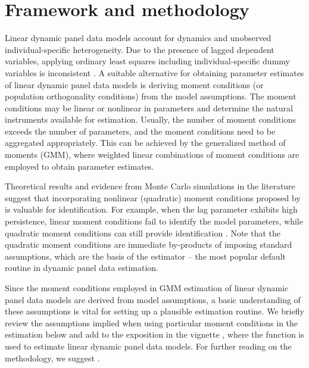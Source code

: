 \section{Framework and methodology}\label{sec:ldpdm}
Linear dynamic panel data models account for dynamics and unobserved individual-specific heterogeneity. Due to the presence of lagged dependent variables, applying ordinary least squares including individual-specific dummy variables is inconsistent \citep[see, e.g.,][]{Hsi2014}.
A suitable alternative for obtaining parameter estimates of linear dynamic panel data models is deriving moment conditions (or population orthogonality conditions) from the model assumptions. The moment conditions may be linear \citep{AndHsi1982,HolNewRos1988,AreBov1995} or nonlinear \citep{AhnSch1995} in parameters and determine the natural instruments available for estimation. Usually, the number of moment conditions exceeds the number of parameters, and the moment conditions need to be aggregated appropriately. This can be achieved by the generalized method of moments (GMM), where weighted linear combinations of moment conditions are employed to obtain parameter estimates.

Theoretical results and evidence from Monte Carlo simulations in the literature suggest that incorporating nonlinear (quadratic) moment conditions proposed by \citet{AhnSch1995} is valuable for identification. For example, when the lag parameter exhibits high persistence, linear moment conditions fail to identify the model parameters, while quadratic moment conditions can still provide identification \citep{BunKle2014,BunSar2015,GorHanXue2016,PuaFriSch2019a,PuaFriSch2019b}.
Note that the quadratic moment conditions are immediate by-products of imposing
standard assumptions, which are the basis of the \cite{AreBon1991} estimator -- the most popular default routine in dynamic panel data estimation.

Since the moment conditions employed in GMM estimation of linear dynamic panel data models are derived from model assumptions, a basic understanding of these assumptions is vital for setting up a plausible estimation routine. We briefly review the assumptions implied when using particular moment conditions in the estimation below and add to the exposition in the  vignette \citep{CroMil2019plm}, where the function  is used to estimate linear dynamic panel data models. For further reading on the methodology, we suggest \citet{Fri2019}.


